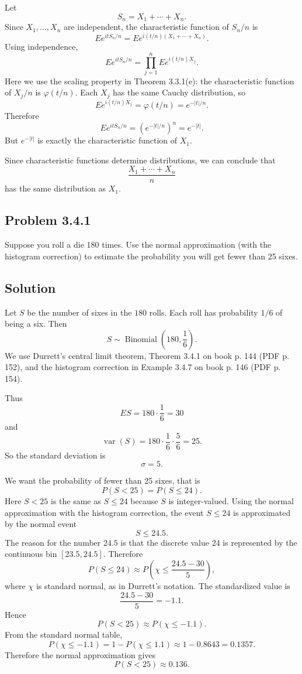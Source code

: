 \documentclass[a4paper,12pt,openany]{article}
\theoremstyle{plain}
\theoremstyle{definition}
\begin{document}
\medskip

Let
\[
S_n=X_1+\cdots+X_n.
\]
Since $X_1,\ldots,X_n$ are independent, the characteristic function of $S_n/n$ is
\[
E e^{itS_n/n}
=
E e^{i(t/n)(X_1+\cdots+X_n)}.
\]
Using independence,
\[
E e^{itS_n/n}
=
\prod_{j=1}^{n}E e^{i(t/n)X_j}.
\]
Here we use the scaling property in Theorem 3.3.1(e): the characteristic function of $X_j/n$ is $\varphi(t/n)$.
Each $X_j$ has the same Cauchy distribution, so
\[
E e^{i(t/n)X_j}
=
\varphi(t/n)
=
e^{-|t|/n}.
\]
Therefore
\[
E e^{itS_n/n}
=
\left(e^{-|t|/n}\right)^n
=
e^{-|t|}.
\]
But $e^{-|t|}$ is exactly the characteristic function of $X_1$.

\medskip

Since characteristic functions determine distributions, we can conclude that
\[
\frac{X_1+\cdots+X_n}{n}
\]
has the same distribution as $X_1$.

\subsection*{Problem 3.4.1}

Suppose you roll a die 180 times. Use the normal approximation (with the histogram correction) to estimate the probability you will get fewer than 25 sixes.

\subsection*{Solution}

Let $S$ be the number of sixes in the $180$ rolls. Each roll has probability $1/6$ of being a six. Then
\[
S\sim \operatorname{Binomial}\left(180,\frac16\right).
\]
We use Durrett's central limit theorem, Theorem 3.4.1 on book p. 144 (PDF p. 152), and the histogram correction in Example 3.4.7 on book p. 146 (PDF p. 154).

\medskip

Thus
\[
ES=180\cdot \frac16=30
\]
and
\[
\operatorname{var}(S)
=
180\cdot\frac16\cdot\frac56
=
25.
\]
So the standard deviation is
\[
\sigma=5.
\]

\medskip

We want the probability of fewer than $25$ sixes, that is
\[
P(S<25)=P(S\le 24).
\]
Here $S<25$ is the same as $S\le 24$ because $S$ is integer-valued.
Using the normal approximation with the histogram correction, the event $S\le 24$ is approximated by the normal event
\[
S\le 24.5.
\]
The reason for the number $24.5$ is that the discrete value $24$ is represented by the continuous bin $[23.5,24.5]$.
Therefore
\[
P(S\le 24)
\approx
P\left(\chi\le \frac{24.5-30}{5}\right),
\]
where $\chi$ is standard normal, as in Durrett's notation. The standardized value is
\[
\frac{24.5-30}{5}
=
-1.1.
\]
Hence
\[
P(S<25)
\approx
P(\chi\le -1.1).
\]
From the standard normal table,
\[
P(\chi\le -1.1)
=
1-P(\chi\le 1.1)
\approx
1-0.8643
=
0.1357.
\]
Therefore the normal approximation gives
\[
P(S<25)\approx 0.136.
\]
\end{document}
